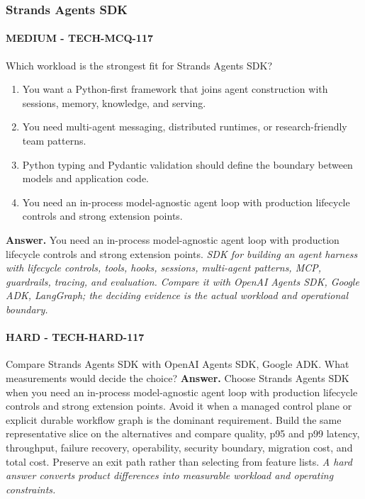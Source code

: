 \subsubsection*{Strands Agents SDK}
\paragraph{MEDIUM - TECH-MCQ-117} Which workload is the strongest fit for Strands Agents SDK?
\begin{enumerate}[label=\Alph*.]
\item You want a Python-first framework that joins agent construction with sessions, memory, knowledge, and serving.
\item You need multi-agent messaging, distributed runtimes, or research-friendly team patterns.
\item Python typing and Pydantic validation should define the boundary between models and application code.
\item You need an in-process model-agnostic agent loop with production lifecycle controls and strong extension points.
\end{enumerate}
\textbf{Answer.} You need an in-process model-agnostic agent loop with production lifecycle controls and strong extension points.
\textit{SDK for building an agent harness with lifecycle controls, tools, hooks, sessions, multi-agent patterns, MCP, guardrails, tracing, and evaluation. Compare it with OpenAI Agents SDK, Google ADK, LangGraph; the deciding evidence is the actual workload and operational boundary.}
\paragraph{HARD - TECH-HARD-117} Compare Strands Agents SDK with OpenAI Agents SDK, Google ADK. What measurements would decide the choice?
\textbf{Answer.} Choose Strands Agents SDK when you need an in-process model-agnostic agent loop with production lifecycle controls and strong extension points. Avoid it when a managed control plane or explicit durable workflow graph is the dominant requirement. Build the same representative slice on the alternatives and compare quality, p95 and p99 latency, throughput, failure recovery, operability, security boundary, migration cost, and total cost. Preserve an exit path rather than selecting from feature lists.
\textit{A hard answer converts product differences into measurable workload and operating constraints.}

